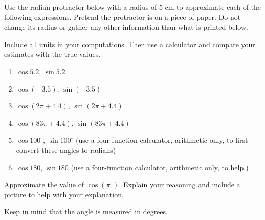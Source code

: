 \documentclass{ximera}
\begin{document}
\begin{question}\label{Exp1:CFsdfdfdseeFFR}
Use the radian protractor below with a radius of $5$ cm to approximate each of the following expressions. Pretend the protractor is on a piece of paper. Do not change its radius or gather any other information than what is printed below.

Include all units in your computations. Then use a calculator and compare your estimates with the true values. 

 
\begin{onlineOnly}
    \begin{center}
\end{center}
\end{onlineOnly}


\begin{enumerate}

\item $\cos 5.2$, $\sin 5.2$  


\item $\cos (-3.5)$,  $\sin (-3.5)$ %

\item $\cos (2\pi + 4.4)$, $\sin (2\pi+4.4)$ 

\item $\cos (83\pi + 4.4)$, $\sin (83\pi+4.4)$ 

\item $\cos 100^\circ$, $\sin 100^\circ$ (use a four-function calculator, arithmetic only, to first convert these angles to radians)

\item $\cos 180$, $\sin 180$ (use a four-function calculator, arithmetic only, to help.)

\end{enumerate}

\end{question}

\begin{question} \label{Q2:Cosine454}
Approximate the value of $\cos (\pi^\circ)$. Explain your reasoning and include a picture to help with your explanation.
\begin{hint}
Keep in mind that the angle is measured in degrees.
\end{hint}
\end{question}
\end{document}
